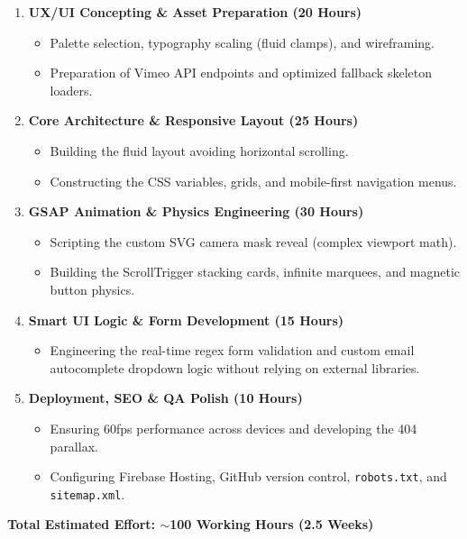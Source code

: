\documentclass[11pt, a4paper]{article}
\begin{document}
\begin{enumerate}
    \item \textbf{UX/UI Concepting \& Asset Preparation (20 Hours)}
    \begin{itemize}
        \item Palette selection, typography scaling (fluid clamps), and wireframing.
        \item Preparation of Vimeo API endpoints and optimized fallback skeleton loaders.
    \end{itemize}
    \item \textbf{Core Architecture \& Responsive Layout (25 Hours)}
    \begin{itemize}
        \item Building the fluid layout avoiding horizontal scrolling.
        \item Constructing the CSS variables, grids, and mobile-first navigation menus.
    \end{itemize}
    \item \textbf{GSAP Animation \& Physics Engineering (30 Hours)}
    \begin{itemize}
        \item Scripting the custom SVG camera mask reveal (complex viewport math).
        \item Building the ScrollTrigger stacking cards, infinite marquees, and magnetic button physics.
    \end{itemize}
    \item \textbf{Smart UI Logic \& Form Development (15 Hours)}
    \begin{itemize}
        \item Engineering the real-time regex form validation and custom email autocomplete dropdown logic without relying on external libraries.
    \end{itemize}
    \item \textbf{Deployment, SEO \& QA Polish (10 Hours)}
    \begin{itemize}
        \item Ensuring 60fps performance across devices and developing the 404 parallax.
        \item Configuring Firebase Hosting, GitHub version control, \texttt{robots.txt}, and \texttt{sitemap.xml}.
    \end{itemize}
\end{enumerate}

\textbf{Total Estimated Effort: $\sim$100 Working Hours (2.5 Weeks)}
\end{document}
